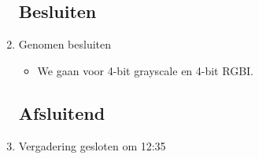 \documentclass{article}
\begin{document}
\begin{enumerate}

	\subsection*{Besluiten}
	\item Genomen besluiten
	\begin{itemize}
		\item We gaan voor 4-bit grayscale en 4-bit RGBI.
	\end{itemize}

	\noindent 
	\subsection*{Afsluitend}
	\item Vergadering gesloten om 12:35 %

\end{enumerate}
\end{document}
